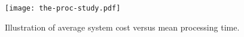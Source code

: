 \begin{figure}[hbt]                                                 %
    \centering                                                      %
    \texttt{[image: the-proc-study.pdf]}      %
    \caption{Illustration of average system cost versus mean processing time.}
    \label{fig:ss_dist}                                             %
\end{figure}                                                        %


